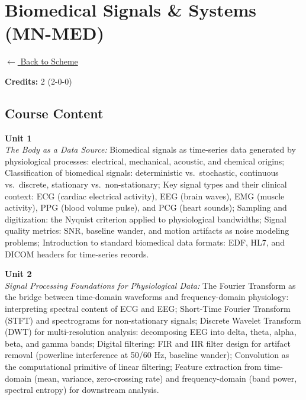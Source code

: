 \section*{Biomedical Signals \& Systems (MN-MED)}
\label{minor:MED_L1}

\noindent \small{\hyperref[main:scheme]{$\leftarrow$ Back to Scheme}} \vspace{0.5cm}

\noindent \textbf{Credits:} 2 (2-0-0)

\subsection*{Course Content}
\noindent\textbf{Unit 1} \\
\textit{The Body as a Data Source:} Biomedical signals as time-series data generated by physiological processes: electrical, mechanical, acoustic, and chemical origins; Classification of biomedical signals: deterministic vs.\ stochastic, continuous vs.\ discrete, stationary vs.\ non-stationary; Key signal types and their clinical context: ECG (cardiac electrical activity), EEG (brain waves), EMG (muscle activity), PPG (blood volume pulse), and PCG (heart sounds); Sampling and digitization: the Nyquist criterion applied to physiological bandwidths; Signal quality metrics: SNR, baseline wander, and motion artifacts as noise modeling problems; Introduction to standard biomedical data formats: EDF, HL7, and DICOM headers for time-series records.

\vspace{0.3cm}

\noindent\textbf{Unit 2} \\
\textit{Signal Processing Foundations for Physiological Data:} The Fourier Transform as the bridge between time-domain waveforms and frequency-domain physiology: interpreting spectral content of ECG and EEG; Short-Time Fourier Transform (STFT) and spectrograms for non-stationary signals; Discrete Wavelet Transform (DWT) for multi-resolution analysis: decomposing EEG into delta, theta, alpha, beta, and gamma bands; Digital filtering: FIR and IIR filter design for artifact removal (powerline interference at 50/60 Hz, baseline wander); Convolution as the computational primitive of linear filtering; Feature extraction from time-domain (mean, variance, zero-crossing rate) and frequency-domain (band power, spectral entropy) for downstream analysis.

\vspace{0.3cm}

